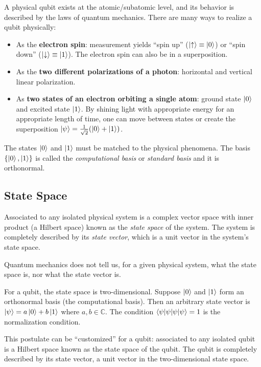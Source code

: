 \documentclass[10pt,a4paper]{article}
\begin{document}
A physical qubit exists at the atomic/subatomic level, and its behavior is described by the laws of quantum mechanics. There are many ways to realize a qubit physically:
\begin{itemize}[nosep]
\item As the \textbf{electron spin}: measurement yields ``spin up'' ($\ket{\uparrow}\equiv\ket{0}$) or ``spin down'' ($\ket{\downarrow}\equiv\ket{1}$). The electron spin can also be in a superposition.
\item As the \textbf{two different polarizations of a photon}: horizontal and vertical linear polarization.
\item As \textbf{two states of an electron orbiting a single atom}: ground state $\ket{0}$ and excited state $\ket{1}$. By shining light with appropriate energy for an appropriate length of time, one can move between states or create the superposition $\ket{\psi}=\frac{1}{\sqrt{2}}(\ket{0}+\ket{1})$.
\end{itemize}
The states $\ket{0}$ and $\ket{1}$ must be matched to the physical phenomena. The basis $\{\ket{0},\ket{1}\}$ is called the \emph{computational basis} or \emph{standard basis} and it is orthonormal.

\subsection{State Space}

\begin{tcolorbox}[propstyle, title={Postulate}]
Associated to any isolated physical system is a complex vector space with inner product (a Hilbert space) known as the \emph{state space} of the system. The system is completely described by its \emph{state vector}, which is a unit vector in the system's state space.

Quantum mechanics does not tell us, for a given physical system, what the state space is, nor what the state vector is.
\end{tcolorbox}

For a qubit, the state space is two-dimensional. Suppose $\ket{0}$ and $\ket{1}$ form an orthonormal basis (the computational basis). Then an arbitrary state vector is $\ket{\psi}=a\ket{0}+b\ket{1}$ where $a,b\in\mathbb{C}$. The condition $\braket{\psi|\psi}=1$ is the normalization condition.

This postulate can be ``customized'' for a qubit: associated to any isolated qubit is a Hilbert space known as the state space of the qubit. The qubit is completely described by its state vector, a unit vector in the two-dimensional state space.
\end{document}
